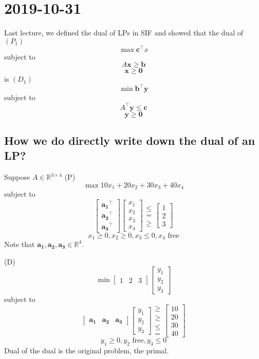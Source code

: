 \section{2019-10-31}
Last lecture, we defined the dual of LPs in SIF and showed that
the dual of
$ (P_1) $
\[ \max \bm{c}^\top x\]
subject to
\[ A \bm{x}\ge \bm{b} \]
\[ \bm{x}\ge \bm{0} \]
is
$ (D_1) $
\[ \min \bm{b}^\top \bm{y} \]
subject to
\[ A ^\top \bm{y}\le \bm{c} \]
\[ \bm{y}\ge \bm{0} \]

\subsection{How we do directly write down the dual of an LP?}
Suppose $ A\in\mathbb{R}^{3\times 4} $
(P)
\[ \max 10x_1+20x_2+30x_3+40x_4 \]
subject to
\[ \begin{bmatrix}
    \bm{a_1}^\top\\
    \bm{a_2}^\top\\
    \bm{a_3}^\top
\end{bmatrix}
\begin{bmatrix}
    x_1\\
    x_2\\
    x_3\\
    x_4
\end{bmatrix}
\begin{matrix}
    \le\\
    =\\
    \ge
\end{matrix}
\begin{bmatrix}
    1\\
    2\\
    3
\end{bmatrix}\]
\[ x_1\ge 0, x_2\ge 0, x_3\le 0, x_4 \text{ free} \]
Note that $ \bm{a_1},\bm{a_2},\bm{a_3}\in \mathbb{R}^{4} $.

(D)
\[ \min \begin{bmatrix}
    1 & 2 & 3
\end{bmatrix}
\begin{bmatrix}
    y_1\\
    y_2\\
    y_3
\end{bmatrix}\]
subject to
\[ 
\begin{bmatrix}
    \bm{a_1} & \bm{a_2} & \bm{a_3}
\end{bmatrix}
\begin{bmatrix}
    y_1\\
    y_2\\
    y_3
\end{bmatrix}
\begin{matrix}
    \ge\\
    \ge\\
    \le\\
    =
\end{matrix}
\begin{bmatrix}
    10\\
    20\\
    30\\
    40
\end{bmatrix}\]
\[ y_1\ge 0, y_2 \text{ free}, y_3\le 0 \]
Dual of the dual is the original problem, the primal.

